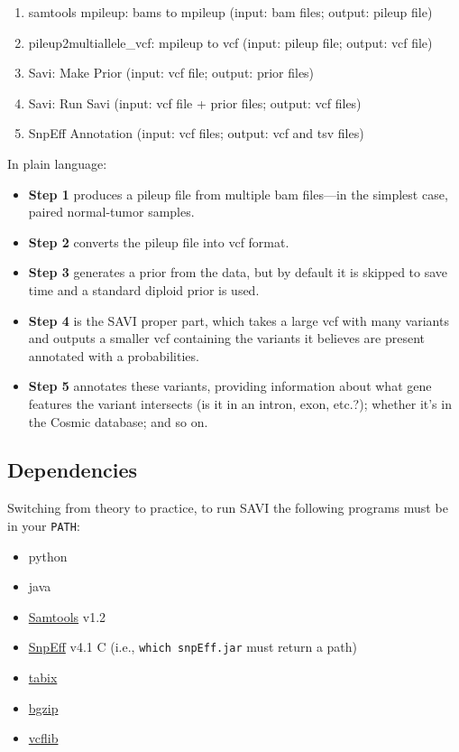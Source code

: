 \documentclass[letterpaper,14pt]{memoir}
\begin{document}
\begin{enumerate}
\def\labelenumi{\arabic{enumi}.}
\tightlist
\item
  samtools mpileup: bams to mpileup (input: bam files; output: pileup file)
\item
  pileup2multiallele\_vcf: mpileup to vcf (input: pileup file; output: vcf file)
\item
  Savi: Make Prior (input: vcf file; output: prior files)
\item
  Savi: Run Savi (input: vcf file + prior files; output: vcf files)
\item
  SnpEff Annotation (input: vcf files; output: vcf and tsv files)
\end{enumerate}

\noindent In plain language:

\begin{itemize}
\tightlist
\item
  \textbf{Step 1} produces a pileup file from multiple bam files---in the simplest case, paired normal-tumor samples.
\item
  \textbf{Step 2} converts the pileup file into vcf format.
\item
  \textbf{Step 3} generates a prior from the data, but by default it is skipped to save time and a standard diploid prior is used.
\item
  \textbf{Step 4} is the SAVI proper part, which takes a large vcf with many variants and outputs a smaller vcf containing the variants it believes are present annotated with a probabilities.
\item
  \textbf{Step 5} annotates these variants, providing information about what gene features the variant intersects (is it in an intron, exon, etc.?); whether it's in the Cosmic database; and so on. 
\end{itemize}

\subsection{Dependencies}\label{dependencies}

Switching from theory to practice, to run SAVI the following programs must be in your \texttt{PATH}:

\begin{itemize}
\tightlist
\item
  python
\item
  java
\item
  \href{http://samtools.sourceforge.net}{Samtools} v1.2
\item
  \href{http://snpeff.sourceforge.net}{SnpEff} v4.1 C (i.e., \texttt{which\ snpEff.jar} must return a path)
\item
  \href{http://samtools.sourceforge.net/tabix.shtml}{tabix}
\item
  \href{http://samtools.sourceforge.net/tabix.shtml}{bgzip}
\item
  \href{https://github.com/ekg/vcflib}{vcflib}
\end{itemize}
\end{document}
